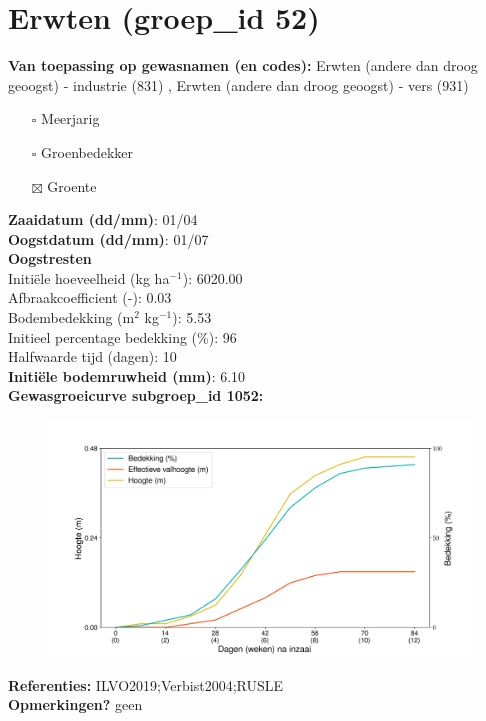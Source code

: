 \documentclass{article}
\begin{document}
 \section{Erwten (groep\_id 52)} 
 \textbf{Van toepassing op gewasnamen (en codes):} Erwten (andere dan droog geoogst) - industrie (831) , Erwten (andere dan droog geoogst) - vers (931) 
 \begin{multicols}{3} \begin{itemize} \item[$\square$] Meerjarig \item[$\square$] Groenbedekker \item[$\boxtimes$] Groente \end{itemize} \end{multicols} 
  \textbf{Zaaidatum (dd/mm)}: 01/04  \vspace{0.10cm} \\ 
  \textbf{Oogstdatum (dd/mm)}: 01/07  \vspace{0.10cm} \\ 
  \textbf{Oogstresten} \vspace{0.05cm} \\ 
  \tab Initi\"{e}le hoeveelheid (kg ha$^{-1}$): 6020.00 \vspace{0.05cm} \\ 
  \tab Afbraakcoefficient (-): 0.03 \vspace{0.05cm} \\ 
  \tab Bodembedekking (m$^2$ kg$^{-1}$): 5.53 \vspace{0.05cm} \\ 
  \tab Initieel percentage bedekking (\%): 96 \vspace{0.05cm} \\ 
  \tab Halfwaarde tijd (dagen): 10 \vspace{0.05cm} \\ 
  \textbf{Initi\"{e}le bodemruwheid (mm)}: 6.10 \vspace{0.05cm} \\ 
  \textbf{Gewasgroeicurve subgroep\_id 1052:} 
 \begin{center} \begin{figure}[H] \includegraphics[width=12.5cm]{temp/1052.png} \end{figure} \end{center} 
  \textbf{Referenties:} ILVO2019;Verbist2004;RUSLE \vspace{0.10cm} \\ 
  \textbf{Opmerkingen?} geen \vspace{0.10cm} \\ 
 \newpage 
\end{document}
